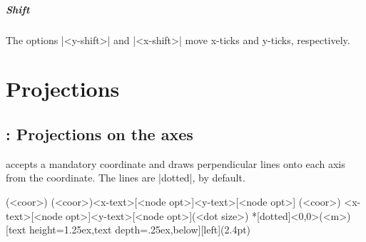 \begin{tzcode}{.3}
\end{tzcode}

\paragraph{Shift}
The options |<y-shift>| and |<x-shift>| move x-ticks and y-ticks, respectively.

\begin{tzcode}{.3}
\end{tzcode}




\chapter{Projections}
\label{c:projections}

\section{\protect\cmd{\tzproj(*)}: Projections on the axes}
\label{s:tzproj}

\icmd{\tzproj} accepts a mandatory coordinate and draws perpendicular lines onto each axis from the coordinate. The lines are |dotted|, by default.

\begin{tzdef}
\tzproj(<coor>)
\tzproj*(<coor>){<x-text>}[<node opt>]{<y-text>}[<node opt>]
(<coor>)
        {<x-text>}[<node opt>]{<y-text>}[<node opt>](<dot size>)
 *[dotted]<0,0>(<m>){}[text height=1.25ex,text depth=.25ex,below]{}[left](2.4pt)
\end{tzdef}

